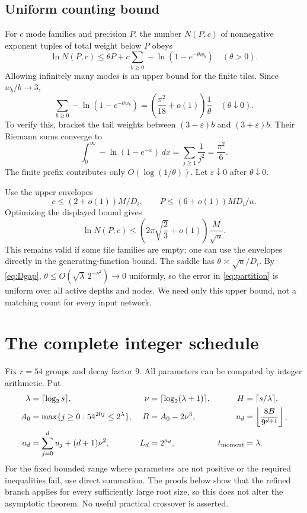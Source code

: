 \documentclass[11pt]{article}
\theoremstyle{remark}\newtheorem{remark}[theorem]{Remark}
\newcommand{\lp}{\log_2}
\begin{document}
\subsection{Uniform counting bound}
For $c$ mode families and precision $P$, the number $N(P,c)$ of nonnegative exponent tuples of total weight below $P$ obeys
\[
 \ln N(P,c)\le\theta P+c\sum_{b\ge0}-\ln(1-e^{-\theta w_b})
 \quad(\theta>0).
\]
Allowing infinitely many modes is an upper bound for the finite tiles. Since $w_b/b\to3$,
\begin{equation}
 \sum_{b\ge0}-\ln(1-e^{-\theta w_b})
 =\left(\frac{\pi^2}{18}+o(1)\right)\frac1\theta
 \quad(\theta\downarrow0).
 \label{eq:partition}
\end{equation}
To verify this, bracket the tail weights between $(3-\varepsilon)b$ and $(3+\varepsilon)b$. Their Riemann sums converge to
\[
 \int_0^\infty-\ln(1-e^{-x})\,dx
 =\sum_{j\ge1}\frac1{j^2}=\frac{\pi^2}{6}.
\]
The finite prefix contributes only $O(\log(1/\theta))$. Let $\varepsilon\downarrow0$ after $\theta\downarrow0$.

Use the upper envelopes
\[
 c\le(2+o(1))M/D_i,
 \qquad P\le(6+o(1))MD_i/u.
\]
Optimizing the displayed bound gives
\begin{equation}
 \ln N(P,c)\le
 \left(2\pi\sqrt{\frac23}+o(1)\right)\frac M{\sqrt u}.
 \label{eq:local-entropy}
\end{equation}
This remains valid if some tile families are empty; one can use the envelopes directly in the generating-function bound. The saddle has $\theta\asymp\sqrt u/D_i$. By \eqref{eq:Dgap}, $\theta\le O(\sqrt\lambda\,2^{-\nu^2})\to0$ uniformly, so the error in \eqref{eq:partition} is uniform over all active depths and nodes. We need only this upper bound, not a matching count for every input network.

\section{The complete integer schedule}
\label{sec:schedule}

Fix $r=54$ groups and decay factor $9$. All parameters can be computed by integer arithmetic. Put
\begin{align}
 \lambda&=\lceil\lp s\rceil,&
 \nu&=\lceil\lp(\lambda+1)\rceil,&
 H&=\lceil s/\lambda\rceil,\notag\\
 A_0&=\max\{j\ge0:54^{20j}\le2^\lambda\},&
 B&=A_0-2\nu^3,&
 u_d&=\left\lfloor\frac{8B}{9^{d+1}}\right\rfloor,\notag\\
 a_d&=\sum_{j=0}^{d}u_j+(d+1)\nu^2,&
 L_d&=2^{a_d},&
 t_{\rm moment}&=\lambda.
 \label{eq:schedule}
\end{align}
For the fixed bounded range where parameters are not positive or the required inequalities fail, use direct summation. The proofs below show that the refined branch applies for every sufficiently large root size, so this does not alter the asymptotic theorem. No useful practical crossover is asserted.
\end{document}
